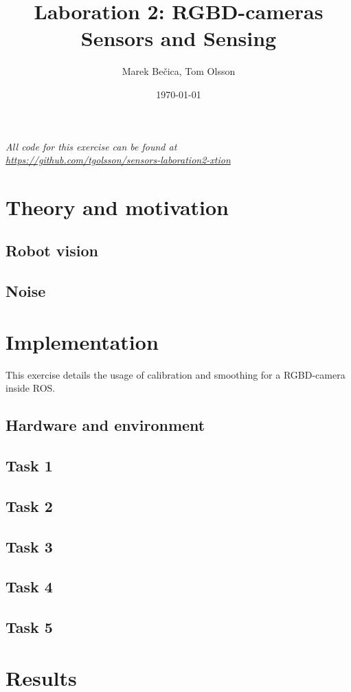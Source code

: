\documentclass[11pt]{article}
\title{Laboration 2: RGBD-cameras\\ {\small Sensors and Sensing}}
\author{Marek Bečica, Tom Olsson}
\date{\today}
\begin{document}
\maketitle %
\begin{center}
  \emph{All code for this exercise can be found at \\ \url{https://github.com/tgolsson/sensors-laboration2-xtion}}
\end{center}
\lstlistoflistings %
\listoffigures %
\listoftables
\lstset{ matchrangestart=t} %
\section{Theory and motivation}
\subsection{Robot vision}
\subsection{Noise}
\section{Implementation}
This exercise details the usage of calibration and smoothing for a RGBD-camera inside ROS.
\subsection{Hardware and environment}
\subsection{Task 1}
\subsection{Task 2}
\subsection{Task 3}
\subsection{Task 4}
\subsection{Task 5}

\section{Results}


\end{document}

